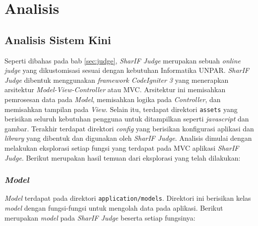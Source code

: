 \chapter{Analisis}
\label{chap:analisis}
\section{Analisis Sistem Kini}
\label{sec:now}
Seperti dibahas pada bab \ref{sec:judge}, \textit{SharIF Judge} merupakan sebuah \textit{online judge} yang dikustomisasi sesuai dengan kebutuhan Informatika UNPAR. \textit{SharIF Judge} dibentuk menggunakan \textit{framework CodeIgniter 3} yang menerapkan arsitektur \textit{Model-View-Controller} atau MVC. Arsitektur ini memisahkan pemrosesan data pada \textit{Model}, memisahkan logika pada \textit{Controller}, dan memisahkan tampilan pada \textit{View}. Selain itu, terdapat direktori \texttt{assets} yang berisikan seluruh kebutuhan pengguna untuk ditampilkan seperti \textit{javascript} dan gambar. Terakhir terdapat direktori \textit{config} yang berisikan konfigurasi aplikasi dan \textit{library} yang dibentuk dan digunakan oleh \textit{SharIF Judge}. Analisis dimulai dengan melakukan eksplorasi setiap fungsi yang terdapat pada MVC aplikasi \textit{SharIF Judge}. Berikut merupakan hasil temuan dari eksplorasi yang telah dilakukan:

\subsection{\textit{Model}}
\textit{Model} terdapat pada direktori \texttt{application/models}. Direktori ini berisikan kelas \textit{model} dengan fungsi-fungsi untuk mengolah data pada aplikasi. Berikut merupakan \textit{model} pada \textit{SharIF Judge} beserta setiap fungsinya:
